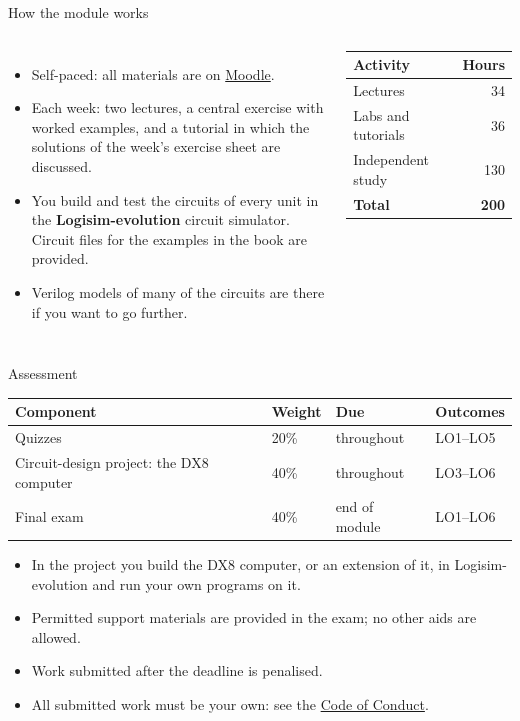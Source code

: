 \documentclass[10pt]{wosm-slides}
\begin{document}
\begin{frame}{How the module works}
  \begin{columns}[T]
      \begin{itemize}
        \item Self-paced: all materials are on
          \href{https://moodle.wosm.academy/course/view.php?id=2}{Moodle}.
        \item Each week: two lectures, a central exercise with worked examples,
          and a tutorial in which the solutions of the week's exercise sheet are
          discussed.
        \item You build and test the circuits of every unit in the
          \textbf{Logisim-evolution} circuit simulator. Circuit files for the
          examples in the book are provided.
        \item Verilog models of many of the circuits are there if you want to go
          further.
      \end{itemize}
      \small
      \begin{tabular}{@{}lr@{}}
        \toprule
        Activity & Hours \\
        \midrule
        Lectures & 34 \\
        Labs and tutorials & 36 \\
        Independent study & 130 \\
        \midrule
        \textbf{Total} & \textbf{200} \\
        \bottomrule
      \end{tabular}

      \medskip
  \end{columns}
\end{frame}

\begin{frame}{Assessment}
  \small
  \begin{tabular}{@{}llll@{}}
    \toprule
    Component & Weight & Due & Outcomes \\
    \midrule
    Quizzes & 20\% & throughout & LO1--LO5 \\
    Circuit-design project: the DX8 computer & 40\% & throughout & LO3--LO6 \\
    Final exam & 40\% & end of module & LO1--LO6 \\
    \bottomrule
  \end{tabular}

  \bigskip
  \normalsize
  \begin{itemize}
    \item In the project you build the DX8 computer, or an extension of it, in
      Logisim-evolution and run your own programs on it.
    \item Permitted support materials are provided in the exam; no other aids
      are allowed.
    \item Work submitted after the deadline is penalised.
    \item All submitted work must be your own: see the
      \href{https://wosm.academy/code-of-conduct/}{Code of Conduct}.
  \end{itemize}
\end{frame}
\end{document}
